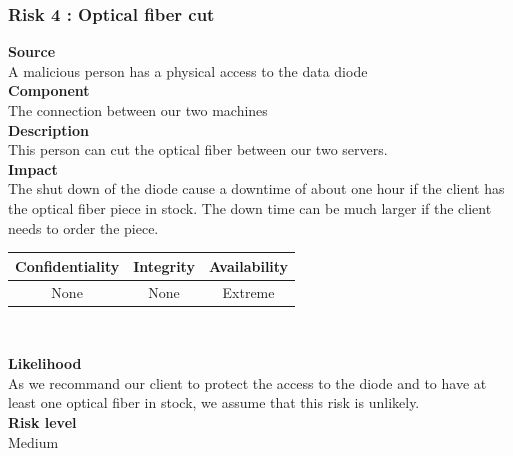 \documentclass[a4paper,11pt]{article}
\begin{document}
\subsubsection{Risk 4 : Optical fiber cut }
\textbf{Source} \\A malicious person has a physical access to the data diode\\
\textbf{Component} \\The connection between our two machines\\
\textbf{Description}\\ This person can cut the optical fiber between our two servers. \\
\textbf{Impact}\\
The shut down of the diode cause a downtime of about one hour if the client has the optical fiber piece in stock. The down time can be much larger if the client needs to order the piece.\\
\begin{center}
\begin{tabular}{|c|c|c|}
\hline
\textbf{Confidentiality} & \textbf{Integrity} & \textbf{Availability} \\
\hline
None & None & Extreme \\
\hline
\end{tabular}\\
\end{center}
\textbf{Likelihood}\\ As we recommand our client to protect the access to the diode and to have at least one optical fiber in stock, we assume that this risk is unlikely.\\
\textbf{Risk level}\\Medium\\
\end{document}
